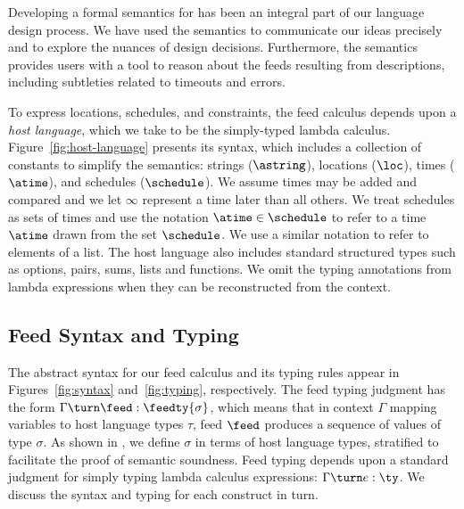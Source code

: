 



Developing a formal semantics for \padsd{} has been an
integral part of our language design process.  We have used the semantics to
communicate our ideas precisely and to explore the nuances of design
decisions. Furthermore, the semantics provides users with a tool to reason about the feeds
resulting from \padsd{} descriptions, including subtleties related to
timeouts and errors.

To express locations, schedules, and constraints, the feed calculus
depends upon a {\em host language}, which we take to be the
simply-typed lambda calculus.  Figure~\ref{fig:host-language} presents
its syntax, which includes a collection of constants to simplify the
semantics: strings ($\astring$), locations ($\loc$), times ($\atime$),
and schedules ($\schedule$).  We assume times may be added and
compared and we let $\infty$ represent a time later than all others.
We treat schedules as sets of times and use the notation $\atime
\in \schedule$ to refer to a time $\atime$ drawn from the set
$\schedule$.  We use a similar notation to refer to elements of a
list.  The host language also includes standard structured types such as
options, pairs, sums, lists and functions.
We omit the typing annotations from lambda expressions when they can
be reconstructed from the context.


\subsection{Feed Syntax and Typing}

The abstract syntax for our feed calculus and its typing rules appear
in Figures~\ref{fig:syntax} and~\ref{fig:typing}, respectively.  The
feed typing judgment has the form $\Gamma \turn \feed :
\feedty{\sigma}$, which means that in context $\Gamma$ mapping
variables to host language types $\tau$, feed $\feed$ produces a
sequence of values of type $\sigma$.  As shown in ,
we define $\sigma$ in terms of host language types, stratified to
facilitate the proof of semantic soundness.  Feed typing depends upon
a standard judgment for simply typing lambda calculus expressions:
$\Gamma \turn e : \ty$.  We discuss the syntax and typing for each
construct in turn.




